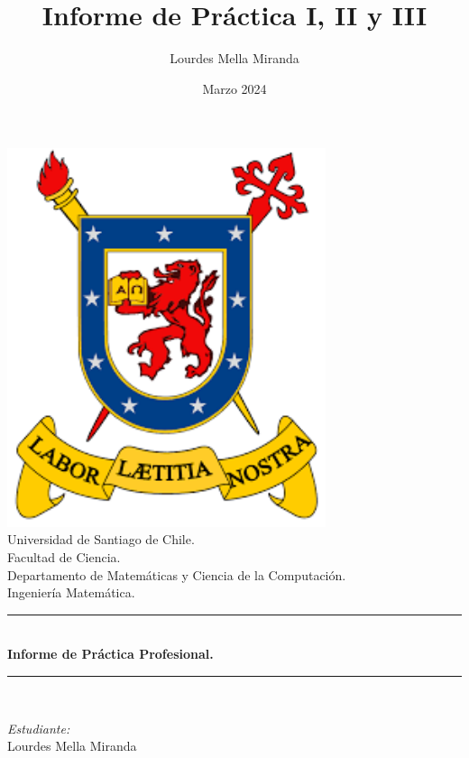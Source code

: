 \documentclass{article}
\title{Informe de Práctica I, II y III}
\author{Lourdes Mella Miranda}
\date{Marzo 2024}
\begin{document}
\begin{titlepage}
\begin{center}

\includegraphics[width=0.7\textwidth]{images/logo_usach.png}\\[1cm]


{\large Universidad de Santiago de Chile.}\\[0.5cm]
{\large Facultad de Ciencia.}\\[0.5cm]
{\large Departamento de Matemáticas y Ciencia de la Computación.}\\[0.5cm]

{\large Ingeniería Matemática.}\\[0.5cm]

\rule{\linewidth}{0.5mm} \\[0.4cm]
{ \huge \bfseries Informe de Práctica Profesional. \\[0.4cm] }
\rule{\linewidth}{0.5mm} \\[1.5cm]

\noindent
\begin{minipage}{0.4\textwidth}
  \begin{flushleft} \large
  \end{flushleft}
\end{minipage}%
\begin{minipage}{0.4\textwidth}
  \begin{flushright} \large
    \emph{Estudiante:} \\
   Lourdes Mella Miranda
  \end{flushright}
\end{minipage}
\\


\end{center}
\end{titlepage}
\end{document}
